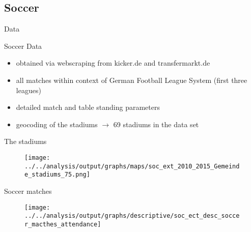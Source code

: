 \documentclass[usenames,dvipsnames]{beamer} %
\begin{document}
	\subsection{Soccer}
	\begin{frame}{Data}
		\begin{block}{Soccer Data}
			\begin{itemize}
				\item obtained via webscraping from kicker.de and transfermarkt.de
				\item all matches within context of German Football League System (first three leagues)
				\item detailed match and table standing parameters
				\item geocoding of the stadiums $\rightarrow$ 69 stadiums in the data set
			\end{itemize}
		\end{block}
	\end{frame}

	\begin{frame}{The stadiums}
		\begin{figure}
			\texttt{[image: ../../analysis/output/graphs/maps/soc\_ext\_2010\_2015\_Gemeinde\_stadiums\_75.png]}
		\end{figure}
	\end{frame}


	\begin{frame}{Soccer matches}
		\begin{figure}
			\texttt{[image: ../../analysis/output/graphs/descriptive/soc\_ect\_desc\_soccer\_macthes\_attendance]}
		\end{figure}
	\end{frame}

\end{document}

